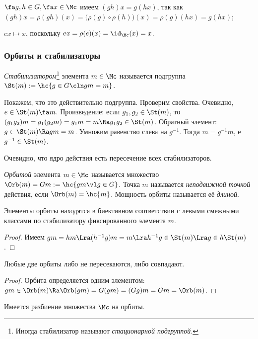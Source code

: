 \documentclass[a4paper]{article}
\begin{document}
 $\fa g, h \in G, \fa x \in \Mc$ имеем $(gh)x=g(hx)$, так как
$(gh)x=\rho(gh)(x)=\bigl(\rho(g)\circ\rho(h)\bigr)(x)=\rho(g)(hx)=g(hx)$;

 $ex \mapsto x$, поскольку $ex=\rho(e)(x)=\id_\Mc(x)=x$.

\subsubsection{Орбиты и стабилизаторы}

\begin{df}
\emph{Стабилизатором}\footnote{Иногда стабилизатор называют \emph{стационарной подгруппой}.} элемента $m \in \Mc$ называется подгруппа
$\St(m):=\hc{g \in G\cln gm=m}$.
\end{df}
Покажем, что это действительно подгруппа. Проверим свойства. Очевидно, $e \in \St(m) \fa m$. Произведение:
если $g_1, g_2 \in \St(m)$, то $(g_1g_2)m=g_1(g_2m)=g_1m=m \Ra g_1g_2\in \St(m)$. Обратный элемент: $g \in
\St(m) \Ra gm=m$. Умножим равенство слева на $g^{-1}$. Тогда $m=g^{-1}m$, е $g^{-1} \in \St(m)$.

Очевидно, что ядро действия есть пересечение всех стабилизаторов.

\begin{df}
\emph{Орбитой} элемента $m \in \Mc$ называется множество $\Orb(m)= G m := \hc{gm \vl g \in G}$. Точка $m$
называется \emph{\emph{неподвижной точкой}} действия, если $\Orb(m)=\hc{m}$. Мощность  орбиты называется
её \emph{длиной}.
\end{df}

\begin{stm}
\label{OrbEqLCStabStm}
Элементы орбиты находятся в биективном соответствии с левыми смежными классами по стабилизатору
фиксированного элемента $m$.
\end{stm}
\begin{proof}
Имеем $gm=hm \Lra (h^{-1}g)m=m \Lra h^{-1}g \in \St(m) \Lra g \in h\St(m)$.
\end{proof}

\begin{stm}
Любые две орбиты либо не пересекаются, либо совпадают.
\end{stm}
\begin{proof}
Орбита определяется одним элементом: $gm \in \Orb(m) \Ra \Orb(gm) = G(gm) = (Gg)m = Gm = \Orb(m)$.
\end{proof}

\begin{imp}
Имеется разбиение множества $\Mc$ на орбиты.
\end{imp}
\end{document}
